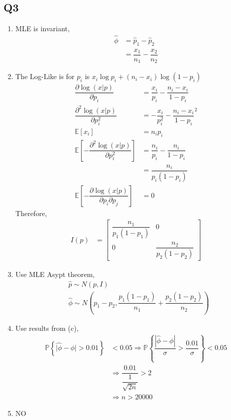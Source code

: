 \documentclass{article}
\begin{document}
\subsection{Q3}
\begin{enumerate}
\item MLE is invariant,
\begin{align*}
\hat{\phi} &= \hat{p}_{1} - \hat{p}_{2}
\\ &= \dfrac{x_{1}}{n_{1}} - \dfrac{x_{2}}{n_{2}}
\end{align*}
\item The Log-Like is for $p_{i}$ is $x_{i} \log p_{i} + \left(n_{i} - x_{i}\right) \log \left(1 - p_{i}\right)$
\begin{align*}
\dfrac{\partial \log \left(x | p\right)}{\partial p_{i}} &= \dfrac{x_{i}}{p_{i}} - \dfrac{n_{i} - x_{i}}{1 - p_{i}}
\\ \dfrac{\partial^2 \log \left(x | p\right)}{\partial p_{i}^2} &= - \dfrac{x_{i}}{p_{i}^{2}} - \dfrac{n_{i} - x_{i}}{1 - p_{i}}^{2}
\\ \mathbb{E}\left[x_{i}\right] &= n_{i} p_{i}
\\ \mathbb{E}\left[- \dfrac{\partial^2 \log\left(x | p\right)}{\partial p_{i}^2}\right] &= \dfrac{n_{i}}{p_{i}} - \dfrac{n_{i}}{1 - p_{i}}
\\ &= \dfrac{n_{i}}{p_{i} \left(1 - p_{i}\right)}
\\ \mathbb{E}\left[- \dfrac{\partial \log\left(x | p\right)}{\partial p_{i} \partial p_{j}}\right] &= 0
\end{align*}
Therefore,
\begin{align*}
I\left(p\right)  &= \begin{bmatrix} \dfrac{n_{1}}{p_{1} \left(1 - p_{1}\right)} & 0 \\ 0 & \dfrac{n_{2}}{p_{2} \left(1 - p_{2}\right)} \end{bmatrix}
\end{align*}
\item Use MLE Asypt theorem,
\begin{align*}
&\hat{p} \sim  N\left(p, I \right)
\\ &\hat{\phi} \sim  N\left(p_{1} - p_{2}, \dfrac{p_{1} \left(1 - p_{1}\right)}{n_{1}} + \dfrac{p_{2} \left(1 - p_{2}\right)}{n_{2}}\right)
\end{align*}
\item Use results from (c),
\begin{align*}
\mathbb{P}\left\{\hat{|\phi} - \phi| > 0.01\right\} &< 0.05 \Rightarrow  \mathbb{P}\left\{\dfrac{| \hat{\phi} - \phi |}{\sigma} > \dfrac{0.01}{\sigma}\right\} < 0.05
\\ &\Rightarrow  \dfrac{0.01}{\dfrac{1}{\sqrt{2 n}}} > 2
\\ &\Rightarrow  n > 20000
\end{align*}
\item NO
\end{enumerate}
\end{document}
